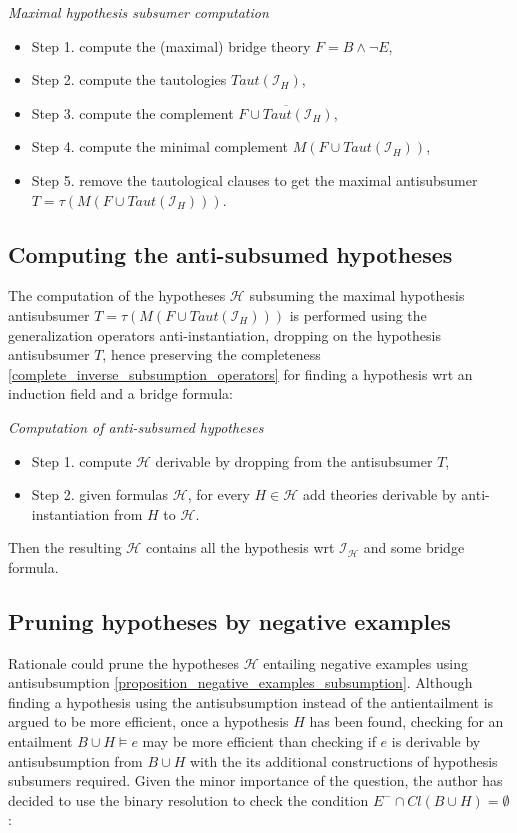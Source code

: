 \begin{algorithm}\label{maximal_hypothesis_antisubsumer_algorithm}\emph{Maximal hypothesis subsumer computation}
\begin{itemize}
\item Step 1. compute the (maximal) bridge theory $F=B \land \neg E$,
\item Step 2. compute the tautologies $Taut(\mathcal{I}_H)$,
\item Step 3. compute the complement $\overline{F \cup Taut(\mathcal{I}_H)}$,
\item Step 4. compute the minimal complement $M(F \cup Taut(\mathcal{I}_H))$,
\item Step 5. remove the tautological clauses to get the maximal antisubsumer $T=\tau(M(F \cup Taut(\mathcal{I}_H)))$.
\end{itemize}
\end{algorithm}

\subsection{Computing the anti-subsumed hypotheses}
The computation of the hypotheses $\mathcal{H}$ subsuming the maximal hypothesis  antisubsumer $T=\tau(M(F \cup Taut(\mathcal{I}_H)))$ is performed using the generalization operators\cite{yamamoto2008towards} anti-instantiation, dropping on the hypothesis antisubsumer $T$, hence preserving the completeness \ref{complete_inverse_subsumption_operators} for finding a hypothesis wrt an induction field and a bridge formula:

\begin{algorithm}\emph{Computation of anti-subsumed hypotheses}
\begin{itemize}
\item Step 1. compute $\mathcal{H}$ derivable by dropping from the antisubsumer $T$,
\item Step 2. given formulas $\mathcal{H}$, for every $H \in \mathcal{H}$ add theories derivable by anti-instantiation from $H$ to $\mathcal{H}$.
\end{itemize}
\end{algorithm}

Then the resulting $\mathcal{H}$ contains all the hypothesis wrt $\mathcal{I_H}$ and some bridge formula.

\subsection{Pruning hypotheses by negative examples}
Rationale could prune the hypotheses $\mathcal{H}$ entailing negative examples using antisubsumption \ref{proposition_negative_examples_subsumption}.
Although finding a hypothesis using the antisubsumption instead of the antientailment is argued to be more efficient\cite{yamamoto2012inverse}, once a hypothesis $H$ has been found, checking for an entailment $B \cup H \models e$ may be more efficient than checking if $e$ is derivable by antisubsumption from $B \cup H$ with the its additional constructions of hypothesis subsumers required. Given the minor importance of the question, the author has decided to use the binary resolution to check the condition $E^- \cap Cl(B \cup H)=\emptyset$:


